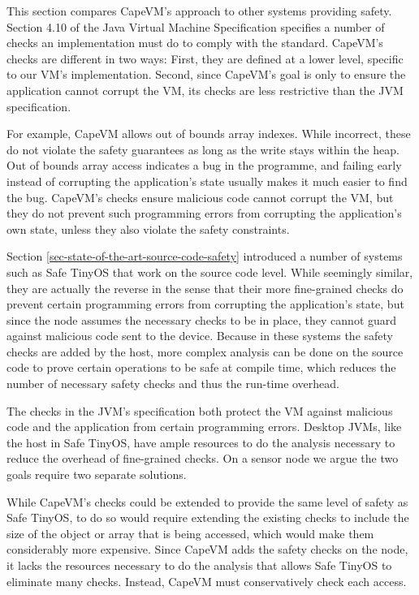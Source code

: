 This section compares CapeVM's approach to other systems providing safety. Section 4.10 of the Java Virtual Machine Specification \cite{Lindholm:2017vu} specifies a number of checks an implementation must do to comply with the standard. CapeVM's checks are different in two ways: First, they are defined at a lower level, specific to our VM's implementation. Second, since CapeVM's goal is only to ensure the application cannot corrupt the VM, its checks are less restrictive than the JVM specification.

For example, CapeVM allows out of bounds array indexes. While incorrect, these do not violate the safety guarantees as long as the write stays within the heap. Out of bounds array access indicates a bug in the programme, and failing early instead of corrupting the application's state usually makes it much easier to find the bug. CapeVM's checks ensure malicious code cannot corrupt the VM, but they do not prevent such programming errors from corrupting the application's own state, unless they also violate the safety constraints.

Section \ref{sec-state-of-the-art-source-code-safety} introduced a number of systems such as Safe TinyOS \cite{Cooprider:2007ub} that work on the source code level. While seemingly similar, they are actually the reverse in the sense that their more fine-grained checks do prevent certain programming errors from corrupting the application's state, but since the node assumes the necessary checks to be in place, they cannot guard against malicious code sent to the device. Because in these systems the safety checks are added by the host, more complex analysis can be done on the source code to prove certain operations to be safe at compile time, which reduces the number of necessary safety checks and thus the run-time overhead.

The checks in the JVM's specification both protect the VM against malicious code and the application from certain programming errors. Desktop JVMs, like the host in Safe TinyOS, have ample resources to do the analysis necessary to reduce the overhead of fine-grained checks. On a sensor node we argue the two goals require two separate solutions.

While CapeVM's checks could be extended to provide the same level of safety as Safe TinyOS, to do so would require extending the existing checks to include the size of the object or array that is being accessed, which would make them considerably more expensive. Since CapeVM adds the safety checks on the node, it lacks the resources necessary to do the analysis that allows Safe TinyOS to eliminate many checks. Instead, CapeVM must conservatively check each access.

